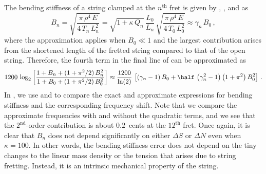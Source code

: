 The bending stiffness of a string clamped at the $n^{\mathrm{th}}$ fret is given by , , and  as
\begin{equation} \label{eqn:bg_n_def}
  B_n = \sqrt{\frac{\pi\, \rho^4\, E}{4\, T_n\, L_n^2}} = \sqrt{1 + \kappa\, Q_n}\, \frac{L_0}{L_n}\, \sqrt{\frac{\pi\, \rho^4\, E}{4\, T_0\, L_0^2}} \approx \gamma_n\, B_0\, ,
\end{equation}
where the approximation applies when $B_0 \ll 1$ and the largest contribution arises from the shortened length of the fretted string compared to that of the open string.
Therefore, the fourth term in the final line of  can be approximated as
 \begin{equation} \label{eqn:dnu_bn}
1200\, \log_2 \left[ \frac{1 + B_n + (1 + \pi^2/2)\, B_n^2}{1 + B_0 + (1 + \pi^2/2)\, B_0^2} \right] \approx \frac{1200}{\ln(2)}\, \left[ \left(\gamma_n - 1\right) B_0 + \half\, \left(\gamma_n^2 - 1\right) \left(1 + \pi^2\right) B_0^2 \right]\, .
 \end{equation}
In , we use  and  to compare the exact and approximate expressions for bending stiffness and the corresponding frequency shift. Note that we compare the approximate frequencies with and without the quadratic terms, and we see that the $2^\mathrm{nd}$-order contribution is about $0.2$~cents at the $12^\mathrm{th}$ fret. Once again, it is clear that $B_n$ does not depend significantly on either $\Delta S$ or $\Delta N$ even when $\kappa = 100$. In other words, the bending stiffness error does not depend on the tiny changes to the linear mass density or the tension that arises due to string fretting. Instead, it is an intrinsic mechanical property of the string.

